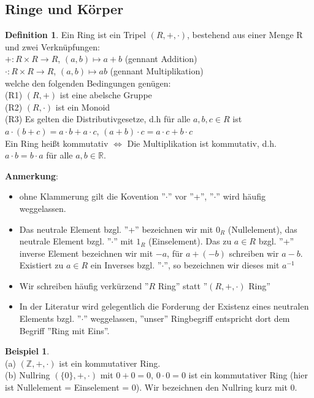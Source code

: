 \documentclass[10pt,a4paper,numbers=endperiod]{scrartcl}
\theoremstyle{definition}
\newtheorem{defi}[satz]{Definition}
\newtheorem{bsp}[satz]{Beispiel}
\begin{document}
\subsection{Ringe und Körper}

\begin{defi}
	Ein Ring ist ein Tripel $(R,+, \cdot)$, bestehend aus einer Menge R und zwei Verknüpfungen:\\
	$+:R \times R \rightarrow R$, $(a,b) \mapsto a+b$ (gennant Addition)\\
	$\cdot: R \times R \rightarrow R$, $(a,b) \mapsto ab$ (gennant Multiplikation)\\
	welche den folgenden Bedingungen genügen:\\
	(R1) $(R,+)$ ist eine abelsche Gruppe\\
	(R2) $(R, \cdot)$ ist ein Monoid\\
	(R3) Es gelten die Distributivgesetze, d.h für alle $a,b,c \in R$ ist $a \cdot (b+c) = a \cdot b + a \cdot c$, $(a+b) \cdot c = a \cdot c + b \cdot c$\\
	Ein Ring heißt kommutativ $\Leftrightarrow$ Die Multiplikation ist kommutativ, d.h. $a \cdot b = b \cdot a$ für alle $a,b \in \mathbb{R}$.
\end{defi}
\newpage
\textbf{Anmerkung}: \begin{itemize}
	\item ohne Klammerung gilt die Kovention ''$\cdot$'' vor ''+'', ''$\cdot$'' wird häufig weggelassen.
	\item Das neutrale Element bzgl. ''+'' bezeichnen wir mit $0_R$ (Nullelement), das neutrale Element bzgl. ''$\cdot$'' mit $1_R$ (Einselement). Das zu $a \in R$ bzgl. ''+'' inverse Element bezeichnen wir mit $-a$, für $a+(-b)$ schreiben wir $a-b$. Existiert zu $a \in R$ ein Inverses bzgl. ''$\cdot$'', so bezeichnen wir dieses mit $a^{-1}$
	\item Wir schreiben häufig verkürzend ''$R$ Ring'' statt ''$(R,+, \cdot)$ Ring''
	\item In der Literatur wird gelegentlich die Forderung der Existenz eines neutralen Elements bzgl. ''$\cdot$'' weggelassen, ''unser'' Ringbegriff entspricht dort dem Begriff ''Ring mit Eins''.
\end{itemize}

\begin{bsp}
	$ $\\
	(a) $(\mathbb{Z},+, \cdot)$ ist ein kommutativer Ring.\\
	(b) Nullring $(\{0\},+, \cdot)$ mit $0+0=0$, $0 \cdot 0 =0$ ist ein kommutativer Ring (hier ist Nullelement = Einselement = 0). Wir bezeichnen den Nullring kurz mit 0.
\end{bsp}
\end{document}
